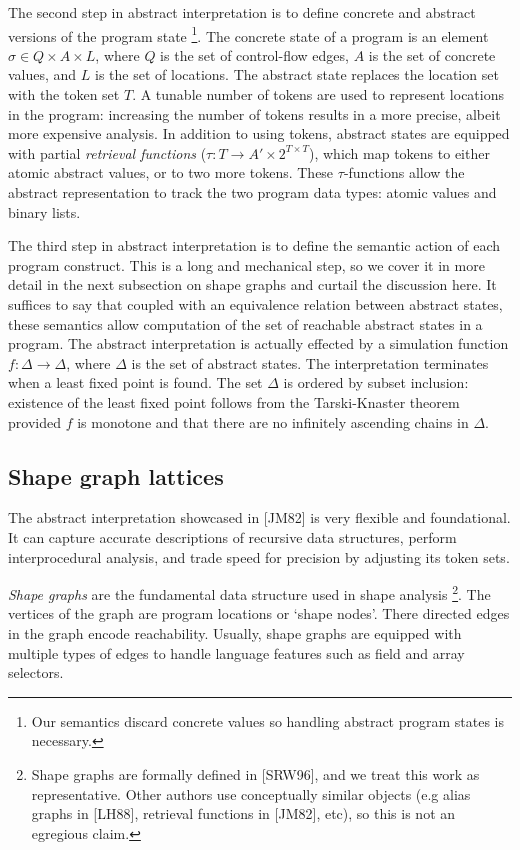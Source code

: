 \documentclass{article}
\begin{document}
The second step in abstract interpretation is to define concrete and
abstract versions of the program state \footnote{Our semantics discard
concrete values so handling abstract program states is necessary.}. The
concrete state of a program is an element $\sigma \in Q \times A \times L$,
where $Q$ is the set of control-flow edges, $A$ is the set of concrete
values, and $L$ is the set of locations. The abstract state replaces the
location set with the token set $T$. A tunable number of tokens are used to
represent locations in the program: increasing the number of tokens results
in a more precise, albeit more expensive analysis. In addition to using
tokens, abstract states are equipped with partial \textit{retrieval
functions} ($\tau : T \rightarrow A' \times 2^{T \times T}$), which map
tokens to either atomic abstract values, or to two more tokens. These
$\tau$-functions allow the abstract representation to track the two program
data types: atomic values and binary lists.

The third step in abstract interpretation is to define the semantic action
of each program construct. This is a long and mechanical step, so we cover
it in more detail in the next subsection on shape graphs and curtail the
discussion here. It suffices to say that coupled with an equivalence
relation between abstract states, these semantics allow computation of the
set of reachable abstract states in a program. The abstract interpretation
is actually effected by a simulation function $f : \Delta \rightarrow
\Delta$, where $\Delta$ is the set of abstract states. The interpretation
terminates when a least fixed point is found. The set $\Delta$ is ordered by
subset inclusion: existence of the least fixed point follows from the
Tarski-Knaster theorem provided $f$ is monotone and that there are no
infinitely ascending chains in $\Delta$.

\subsection{Shape graph lattices}

The abstract interpretation showcased in [JM82] is very flexible and
foundational. It can capture accurate descriptions of recursive data
structures, perform interprocedural analysis, and trade speed for precision
by adjusting its token sets.


\textit{Shape graphs} are the fundamental data structure used in shape
analysis 
    \footnote{Shape graphs are formally defined in [SRW96], and we treat
        this work as representative. Other authors use conceptually similar
        objects (e.g alias graphs in [LH88], retrieval functions in [JM82],
        etc), so this is not an egregious claim.}.
The vertices of the graph are program locations or `shape nodes'.  There
directed edges in the graph encode reachability. Usually, shape graphs are
equipped with multiple types of edges to handle language features such as
field and array selectors.
\end{document}
